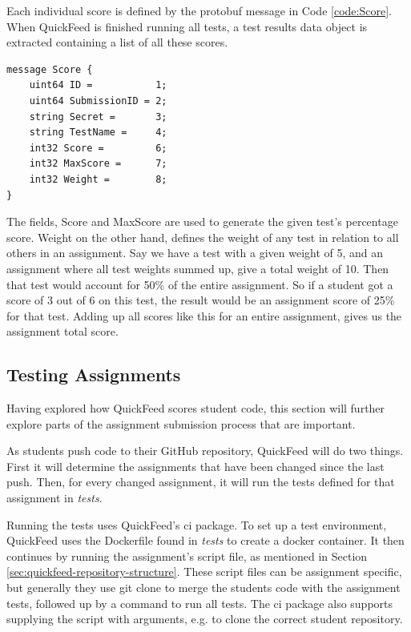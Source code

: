 Each individual score is defined by the protobuf message in Code \ref{code:Score}.
When QuickFeed is finished running all tests, a test results data object is extracted containing a list of all these scores.

\begin{lstlisting}[caption={Score message}, label={code:Score}]
message Score {
    uint64 ID =           1;
    uint64 SubmissionID = 2;
    string Secret =       3;
    string TestName =     4;
    int32 Score =         6;
    int32 MaxScore =      7;
    int32 Weight =        8;
}
\end{lstlisting}

The fields, Score and MaxScore are used to generate the given test's percentage score.
Weight on the other hand, defines the weight of any test in relation to all others in an assignment.
Say we have a test with a given weight of 5, and an assignment where all test weights summed up, give a total weight of 10.
Then that test would account for 50\% of the entire assignment.
So if a student got a score of 3 out of 6 on this test, the result would be an assignment score of 25\% for that test.
Adding up all scores like this for an entire assignment, gives us the assignment total score.

\subsection{Testing Assignments}

Having explored how QuickFeed scores student code, this section will further explore parts of the assignment submission process that are important.

As students push code to their GitHub repository, QuickFeed will do two things.
First it will determine the assignments that have been changed since the last push.
Then, for every changed assignment, it will run the tests defined for that assignment in \textit{tests}.

Running the tests uses QuickFeed's ci package.
To set up a test environment, QuickFeed uses the Dockerfile found in \textit{tests} to create a docker container.
It then continues by running the assignment's script file, as mentioned in Section \ref{sec:quickfeed-repository-structure}.
These script files can be assignment specific, but generally they use git clone to merge the students code with the assignment tests, followed up by a command to run all tests.
The ci package also supports supplying the script with arguments, e.g. to clone the correct student repository.

